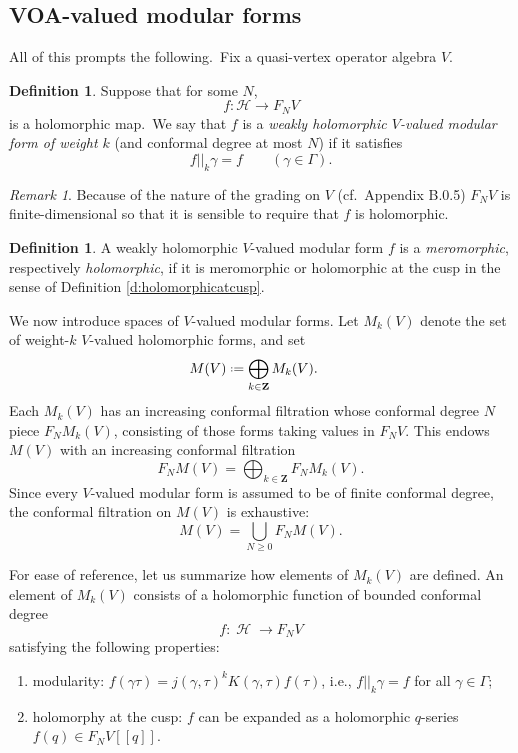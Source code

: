 \documentclass[12pt]{amsart}
\theoremstyle{plain}
\theoremstyle{definition}
\newtheorem{dfn}[thm]{Definition}
\theoremstyle{remark}
\newtheorem{rmk}[thm]{Remark}
\DeclareMathOperator{\uhp}{\mathcal{H}}
\newcommand*{\df}{\mathrel{\vcenter{\baselineskip0.5ex \lineskiplimit0pt
                     \hbox{\scriptsize.}\hbox{\scriptsize.}}} =}
\providecommand{\pseries}[2]{#1[\![ #2 ]\!]}
\newcommand{\ZZ}{\mathbf{Z}}
\begin{document}
\subsection{VOA-valued modular forms}
\label{s:VOAmodular}
All of this prompts the following.\ Fix a  quasi-vertex operator algebra $V$. 
\begin{dfn} Suppose that for some $N$,
$$f:\mathcal{H}\rightarrow F_NV$$
is a holomorphic map.\ We say that $f$ is a \emph{weakly holomorphic $V$-valued modular form of weight $k$} (and conformal degree at most $N$) if it satisfies
$$f||_k\gamma=f\quad\quad (\gamma\in\Gamma).$$
\end{dfn}

\begin{rmk}
  Because of the nature of the grading on $V$ 
  (cf.\ Appendix B.0.5) $F_NV$ is finite-dimensional so that it is sensible to require that $f$ is holomorphic.
\end{rmk}

\begin{dfn} A weakly holomorphic $V$-valued modular form $f$ is a \emph{meromorphic}, respectively \emph{holomorphic}, if it is meromorphic or holomorphic at the cusp in the sense of Definition \ref{d:holomorphicatcusp}.
\end{dfn}

We now introduce spaces of $V$-valued modular forms. Let $M_k(V)$ denote the set of weight-$k$ $V$-valued holomorphic forms, and set
\begin{align*}
M(V) &\df \bigoplus_{k\in\ZZ} M_k(V).
\end{align*}
Each $M_k(V)$ has an increasing conformal filtration whose conformal degree $N$ piece $F_NM_k(V)$, consisting of those forms taking values in $F_NV$. This endows $M(V)$ with an increasing conformal filtration
\[
F_NM(V) = \bigoplus_{k\in\ZZ} F_NM_k(V).    
\]
Since every $V$-valued modular form is assumed to be of finite conformal degree, the conformal filtration on $M(V)$ is exhaustive:
\[
M(V) = \bigcup_{N \geq 0} F_NM(V).    
\]

For ease of reference, let us summarize how elements of $M_k(V)$ are defined. An element of $M_k(V)$ consists of a holomorphic function of bounded conformal degree
\[
f\colon \uhp \to F_NV 
\]
satisfying the following properties:
\begin{enumerate}
    \item modularity: $f(\gamma \tau) = j(\gamma,\tau)^kK(\gamma,\tau)f(\tau)$, i.e., $f||_k\gamma=f $ for all $\gamma \in \Gamma$;
    \item holomorphy at the cusp: $f$ can be expanded as a holomorphic $q$-series $f(q) \in \pseries{F_NV}{q}$.
\end{enumerate}
\end{document}
